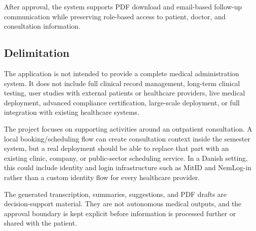 After approval, the system supports PDF download and email-based follow-up communication while preserving role-based access to patient, doctor, and consultation information.

\subsection{Delimitation}
\label{subsec:delimitation}

The application is not intended to provide a complete medical administration system. It does not include full clinical record management, long-term clinical testing, user studies with external patients or healthcare providers, live medical deployment, advanced compliance certification, large-scale deployment, or full integration with existing healthcare systems.

The project focuses on supporting activities around an outpatient consultation. A local booking/scheduling flow can create consultation context inside the semester system, but a real deployment should be able to replace that part with an existing clinic, company, or public-sector scheduling service. In a Danish setting, this could include identity and login infrastructure such as MitID and NemLog-in rather than a custom identity flow for every healthcare provider.

The generated transcription, summaries, suggestions, and PDF drafts are decision-support material. They are not autonomous medical outputs, and the approval boundary is kept explicit before information is processed further or shared with the patient.